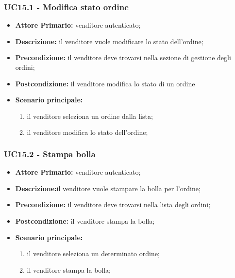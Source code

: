 \subsubsection{UC15.1 - Modifica stato ordine}
\label{UC15.1}
\begin{itemize}
    \item \textbf{Attore Primario:} venditore autenticato;
    \item \textbf{Descrizione:} il venditore vuole modificare lo stato dell'ordine;
    \item \textbf{Precondizione:} il venditore deve trovarsi nella sezione di gestione degli ordini;
    \item \textbf{Postcondizione:} il venditore modifica lo stato di un ordine
    \item \textbf{Scenario principale:}
    \begin{enumerate}
        \item il venditore seleziona un ordine dalla lista;
        \item il venditore modifica lo stato dell'ordine;
    \end{enumerate}
\end{itemize}


\subsubsection{UC15.2 - Stampa bolla}
\label{UC15.2}
\begin{itemize}
    \item \textbf{Attore Primario:} venditore autenticato;
    \item \textbf{Descrizione:}il venditore vuole stampare la bolla per l'ordine;
    \item \textbf{Precondizione:} il venditore deve trovarsi nella lista degli ordini;
    \item \textbf{Postcondizione:} il venditore stampa la bolla;
    \item \textbf{Scenario principale:}
    \begin{enumerate}
        \item il venditore seleziona un determinato ordine;
        \item il venditore stampa la bolla;
    \end{enumerate}
\end{itemize}

